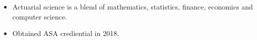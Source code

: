 



\begin{itemize}
\item Actuarial science is a blend of mathematics, statistics, finance, economics and computer science.
\item Obtained ASA crediential in 2018.
\end{itemize}


%
%
%
%
%
%
%



\nocite{*}

%
%
%

